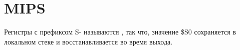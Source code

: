 \section{MIPS}



Регистры с префиксом S- называются , так что, значение \$S0 сохраняется 
в локальном стеке и восстанавливается во время выхода.

